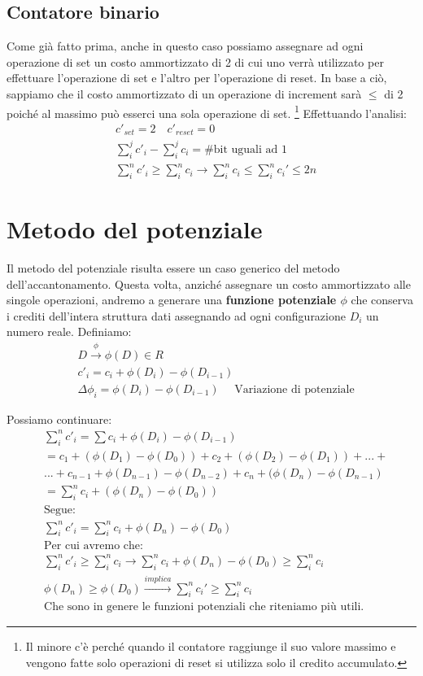 \subsection{Contatore binario}
Come già fatto prima, anche in questo caso possiamo assegnare ad ogni operazione di set un costo ammortizzato di 2 di cui uno verrà utilizzato per effettuare l'operazione di set e l'altro per l'operazione di reset. In base a ciò, sappiamo che il costo ammortizzato di un operazione di increment sarà $\leq$ di 2 poiché al massimo può esserci una sola operazione di set. \footnote{Il minore c'è perché quando il contatore raggiunge il suo valore massimo e vengono fatte solo operazioni di reset si utilizza solo il credito accumulato.} 
Effettuando l'analisi:
\begin{align*}
    &c'_{set} = 2 \quad c'_{reset} = 0 \\
    &\sum_i^jc'_i - \sum_i^jc_i = \text{\# bit uguali ad 1}\\
    &\sum_i^nc'_i \geq \sum_i^nc_i \xrightarrow{} \sum_i^nc_i \leq \sum_i^nc_i'\leq 2n
\end{align*}

\section{Metodo del potenziale}
Il metodo del potenziale risulta essere un caso generico del metodo dell'accantonamento. Questa volta, anziché assegnare un costo ammortizzato alle singole operazioni, andremo a generare una \textbf{funzione potenziale $\phi$} che conserva i crediti dell'intera struttura dati assegnando ad ogni configurazione $D_i$ un numero reale. Definiamo: 
\begin{align*}
    &D \xrightarrow{\phi}\phi(D)\in R\\
    &c'_i = c_i+\phi(D_i)-\phi(D_{i-1})\\
    &\Delta\phi_i = \phi(D_i)-\phi(D_{i-1}) \quad \text{ Variazione di potenziale}
\end{align*}

Possiamo continuare:
\begin{align*}
    &\sum_i^n c'_i = \sum c_i+\phi(D_i)-\phi(D_{i-1})\\
    &=c_1+(\phi(D_1)-\phi(D_0)) + c_2+ (\phi(D_2)-\phi(D_1))+...+\\&...+c_{n-1}+\phi(D_{n-1})-\phi(D_{n-2})+c_n + (\phi(D_{n})-\phi(D_{n-1})\\
    &=\sum_i^n c_i+ (\phi(D_n)-\phi(D_0))\\
    &\text{Segue:}\\
    &\sum_i^n c'_i = \sum_i^n c_i + \phi(D_{n})-\phi(D_{0})\\
    &\text{Per cui avremo che:}\\
    &\sum_i^n c'_i \geq \sum_i^n c_i \xrightarrow{} \sum_i^n c_i + \phi(D_{n})-\phi(D_{0}) \geq \sum_i^n c_i\\
    &\phi(D_n) \geq \phi(D_0)  \xrightarrow{implica} \sum_i^n c_i' \geq \sum_i^n c_i  \\
    &\text{Che sono in genere le funzioni potenziali che riteniamo più utili.}
\end{align*}

